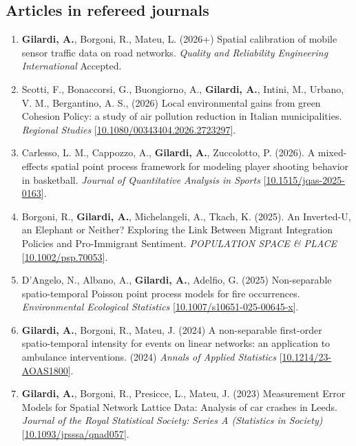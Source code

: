 \documentclass[11pt,a4paper,sans]{moderncv}
\begin{document}
  \subsection{Articles in refereed journals}
  \begin{enumerate}
  	\item \textbf{Gilardi, A.}, Borgoni, R., Mateu, L. (2026+) Spatial calibration of mobile sensor traffic data on road networks. \emph{Quality and Reliability Engineering International} Accepted. 
  	\item Scotti, F., Bonaccorsi, G., Buongiorno, A., \textbf{Gilardi, A.}, Intini, M., Urbano, V. M., Bergantino, A. S., (2026) Local environmental gains from green Cohesion Policy: a study of air pollution reduction in Italian municipalities. \emph{Regional Studies} [\href{https://doi.org/10.1080/00343404.2026.2723297}{10.1080/00343404.2026.2723297}].
  	\item Carlesso, L. M., Cappozzo, A., \textbf{Gilardi, A.}, Zuccolotto, P. (2026). A mixed-effects spatial point process framework for modeling player shooting behavior in basketball. \emph{Journal of Quantitative Analysis in Sports}  [\href{https://doi.org/10.1515/jqas-2025-0163}{10.1515/jqas-2025-0163}]. 
  	\item Borgoni, R., \textbf{Gilardi, A.}, Michelangeli, A., Tkach, K. (2025). An Inverted-U, an Elephant or Neither? Exploring the Link Between Migrant Integration Policies and Pro-Immigrant Sentiment. \emph{POPULATION SPACE \& PLACE} [\href{https://doi.org/10.1002/psp.70053}{10.1002/psp.70053}].
  	\item D’Angelo, N., Albano, A., \textbf{Gilardi, A.}, Adelfio, G. (2025) Non-separable spatio-temporal Poisson point process models for fire occurrences. \emph{Environmental Ecological Statistics} [\href{https://doi.org/10.1007/s10651-025-00645-x}{10.1007/s10651-025-00645-x}].
  	\item \textbf{Gilardi, A.}, Borgoni, R., Mateu, J. (2024) A non-separable first-order spatio-temporal intensity for events on linear networks: an application to ambulance interventions. (2024) \textit{Annals of Applied Statistics} [\href{http://dx.doi.org/10.1214/23-AOAS1800}{10.1214/23-AOAS1800}].
  	\item \textbf{Gilardi, A.}, Borgoni, R., Presicce, L., Mateu, J. (2023) Measurement Error Models for Spatial Network Lattice Data: Analysis of car crashes in Leeds. \textit{Journal of the Royal Statistical Society: Series A (Statistics in Society)} [\href{https://doi.org/10.1093/jrsssa/qnad057}{10.1093/jrsssa/qnad057}].

\end{enumerate}
\end{document}

